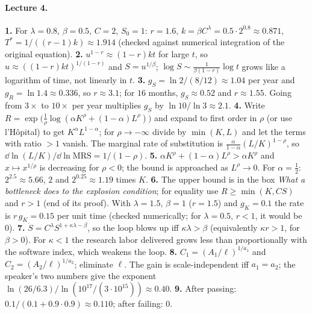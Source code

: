 \paragraph{Lecture 4.}
\textbf{1.} For $\lambda=0.8$, $\beta=0.5$, $C=2$, $S_0=1$: $r=1.6$, $k=\beta C^{\lambda}=0.5\cdot2^{0.8}\approx0.871$, $T^*=1/((r-1)k)\approx1.914$ (checked against numerical integration of the original equation). \quad
\textbf{2.} $u^{1-r}\approx(1-r)kt$ for large $t$, so $u\approx((1-r)kt)^{1/(1-r)}$ and $S=u^{1/\beta}$; $\log S\sim\frac1{\beta(1-r)}\log t$ grows like a logarithm of time, not linearly in $t$. \quad
\textbf{3.} $g_S=\ln2/(8/12)\approx1.04$ per year and $g_R=\ln1.4\approx0.336$, so $r\approx3.1$; for $16$ months, $g_S\approx0.52$ and $r\approx1.55$. Going from $3\times$ to $10\times$ per year multiplies $g_S$ by $\ln10/\ln3\approx2.1$. \quad
\textbf{4.} Write $R=\exp\big(\tfrac1\rho\log(\alpha K^\rho+(1-\alpha)L^\rho)\big)$ and expand to first order in $\rho$ (or use l'H\^opital) to get $K^\alpha L^{1-\alpha}$; for $\rho\to-\infty$ divide by $\min(K,L)$ and let the terms with ratio $>1$ vanish. The marginal rate of substitution is $\frac{\alpha}{1-\alpha}(L/K)^{1-\rho}$, so $\dd\ln(L/K)/\dd\ln\mathrm{MRS}=1/(1-\rho)$. \quad
\textbf{5.} $\alpha K^\rho+(1-\alpha)L^\rho>\alpha K^\rho$ and $x\mapsto x^{1/\rho}$ is decreasing for $\rho<0$; the bound is approached as $L^\rho\to0$. For $\alpha=\frac12$: $2^{2.5}\approx5.66$, $2$ and $2^{0.25}\approx1.19$ times $K$. \quad
\textbf{6.} The upper bound is in the box \emph{What a bottleneck does to the explosion condition}; for equality use $R\ge\min(K,CS)$ and $r>1$ (end of its proof). With $\lambda=1.5$, $\beta=1$ ($r=1.5$) and $g_K=0.1$ the rate is $r\,g_K=0.15$ per unit time (checked numerically; for $\lambda=0.5$, $r<1$, it would be $0$). \quad
\textbf{7.} $\dot S=C^\lambda S^{1+\kappa\lambda-\beta}$, so the loop blows up iff $\kappa\lambda>\beta$ (equivalently $\kappa r>1$, for $\beta>0$). For $\kappa<1$ the research labor delivered grows less than proportionally with the software index, which weakens the loop. \quad
\textbf{8.} $C_1=(A_1/\ell)^{1/a_1}$ and $C_2=(A_2/\ell)^{1/a_2}$; eliminate $\ell$. The gain is scale-independent iff $a_1=a_2$; the speaker's two numbers give the exponent $\ln(26/6.3)/\ln(10^{17}/(3\cdot10^{15}))\approx0.40$. \quad
\textbf{9.} After passing: $0.1/(0.1+0.9\cdot0.9)\approx0.110$; after failing: $0$.

